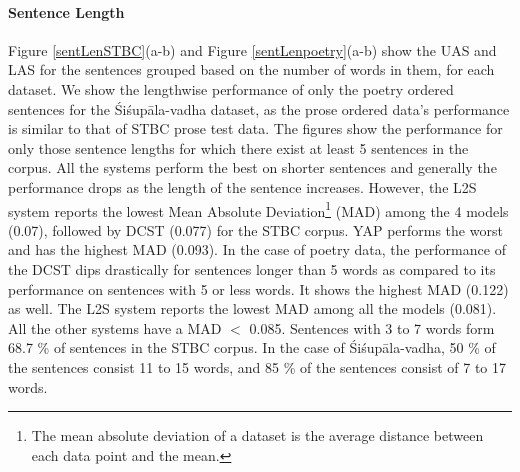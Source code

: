 \documentclass[11pt]{article}
\begin{document}
    
\paragraph{Sentence Length} Figure \ref{sentLenSTBC}(a-b) and Figure \ref{sentLenpoetry}(a-b) show the UAS and LAS for the sentences grouped based on the number of words in them, for each dataset. We show the lengthwise performance of only the poetry ordered sentences for the Śiśupāla-vadha dataset, as the prose ordered data's performance is similar to that of STBC prose test data. The figures show the performance for only those sentence lengths for which there exist  at least  5 sentences in the corpus. All the systems perform the best on shorter sentences and generally the performance drops as the length of the sentence increases. However, the L2S system reports the lowest Mean Absolute Deviation\footnote{The mean absolute deviation of a dataset is the average distance between each data point and the mean.\cite{madUrl}} (MAD) among the 4 models (0.07), followed by DCST (0.077) for the STBC corpus. YAP performs the worst and has the highest MAD (0.093). In the case of poetry data, the performance of the DCST dips drastically for sentences longer than 5 words as compared to its performance on sentences with 5 or less words. It shows the highest MAD (0.122) as well. The L2S system reports the lowest MAD among all the models (0.081). All the other systems have a MAD $<$ 0.085. Sentences with 3 to 7 words form 68.7 \% of sentences  in the  STBC corpus. In the case of   Śiśupāla-vadha, 50 \% of the sentences consist 11 to 15 words, and 85 \% of the sentences consist of  7 to  17 words.
\end{document}
